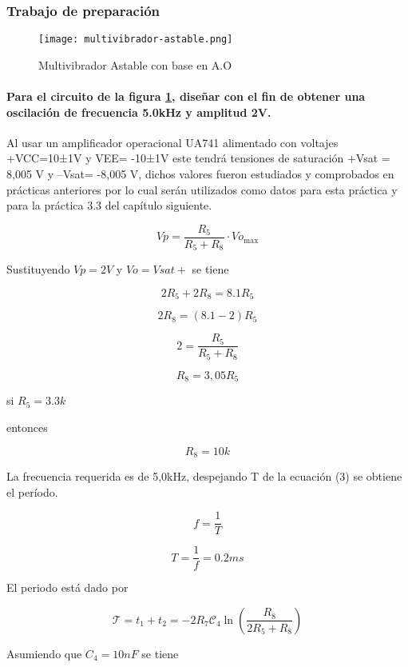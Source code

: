\subsubsection{Trabajo de preparación}

\begin{figure}[ht]
    \centering
    \texttt{[image: multivibrador-astable.png]}
    \caption{Multivibrador Astable con base en A.O}
    \label{fig:multivibrador-astable}
\end{figure}

\paragraph{Para el circuito de la figura \ref{fig:multivibrador-astable}, diseñar con el fin de obtener una oscilación de frecuencia 5.0kHz y amplitud 2V.\\}

Al usar un amplificador operacional UA741 alimentado con voltajes +VCC=10±1V y                     VEE= -10±1V este tendrá tensiones de saturación +Vsat = 8,005 V y –Vsat= -8,005 V, dichos valores fueron estudiados y comprobados en prácticas anteriores por lo cual serán utilizados como datos para esta práctica y para la práctica 3.3 del capítulo siguiente. 

\begin{equation}
    Vp = \frac{R_5}{R_5 + R_8} \cdot Vo_{\text{max}}
\end{equation}

Sustituyendo $Vp= 2V$ y $Vo = Vsat+$ se tiene

$$
2 R_5  + 2 R_8 = 8.1 R_5
$$

$$
2 R_8 = (8.1 - 2) R_5
$$

$$
2 = \frac{R_5}{R_5 + R_8}
$$

$$ R_8 = 3,05R_5$$

si $R_5 = 3.3k $

entonces 

$$ R_8 = 10k$$


La frecuencia requerida es de 5,0kHz, despejando T de la ecuación (3) se obtiene el período.

$$ f = \frac{1}{T} $$


$$ T = \frac{1}{f} = 0.2ms$$

El periodo está dado por

\[
\mathcal{T} = t_1 + t_2 = - 2 R_7 \mathcal{C}_4 \ln \left( \frac{R_8}{2 R_5 + R_8} \right)
\]

Asumiendo que $C_4 = 10nF$ se tiene

